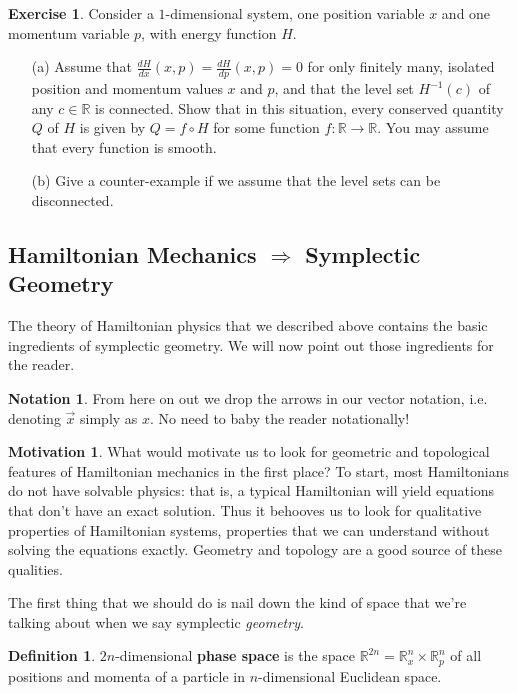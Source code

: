 \documentclass[12pt]{article}
\theoremstyle{definition}
\newtheorem{definition}[theorem]{Definition}
\newtheorem{notation}[theorem]{Notation}
\newtheorem{exercise}[theorem]{Exercise}
\newtheorem{motivation}[theorem]{Motivation}
\numberwithin{equation}{section}
\newcommand{\R}{{\mathbb R}}
\begin{document}
\begin{exercise} Consider a $1$-dimensional system, one position variable $x$ and one momentum variable $p$, with energy function $H$. 
\begin{itemize}
\item[(a)] Assume that $\frac{dH}{dx}(x,p) = \frac{dH}{dp}(x,p) = 0$ for only finitely many, isolated position and momentum values $x$ and $p$, and that the level set $H^{-1}(c)$ of any $c \in \R$ is connected. Show that in this situation, every conserved quantity $Q$ of $H$ is given by $Q = f \circ H$ for some function $f:\R \to \R$. You may assume that every function is smooth.
\item[(b)] Give a counter-example if we assume that the level sets can be disconnected.
\end{itemize}
\end{exercise}

\subsection{Hamiltonian Mechanics $\Rightarrow$ Symplectic Geometry} \label{subsec:hamilton_to_symplectic} The theory of Hamiltonian physics that we described above contains the basic ingredients of symplectic geometry. We will now point out those ingredients for the reader. 

\begin{notation} From here on out we drop the arrows in our vector notation, i.e. denoting $\vec{x}$ simply as $x$. No need to baby the reader notationally!
\end{notation}

\begin{motivation} What would motivate us to look for geometric and topological features of Hamiltonian mechanics in the first place? To start, most Hamiltonians do not have solvable physics: that is, a typical Hamiltonian will yield equations that don't have an exact solution. Thus it behooves us to look for qualitative properties of Hamiltonian systems, properties that we can understand without solving the equations exactly. Geometry and topology are a good source of these qualities. 
\end{motivation}

The first thing that we should do is nail down the kind of space that we're talking about when we say symplectic \emph{geometry}.

\begin{definition} $2n$-dimensional {\bf phase space} is the space $\R^{2n} = \R^n_x \times \R^n_p$ of all positions and momenta of a particle in $n$-dimensional Euclidean space.
\end{definition}
\end{document}
